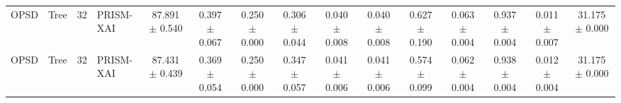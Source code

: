 \begin{table}[t]
\begin{tabular}{llllccccccccccc}
OPSD & Tree & 32 & PRISM-XAI & 87.891 $\pm$ 0.540 & 0.397 $\pm$ 0.067 & 0.250 $\pm$ 0.000 & 0.306 $\pm$ 0.044 & 0.040 $\pm$ 0.008 & 0.040 $\pm$ 0.008 & 0.627 $\pm$ 0.190 & 0.063 $\pm$ 0.004 & 0.937 $\pm$ 0.004 & 0.011 $\pm$ 0.007 & 31.175 $\pm$ 0.000 \\
OPSD & Tree & 32 & PRISM-XAI & 87.431 $\pm$ 0.439 & 0.369 $\pm$ 0.054 & 0.250 $\pm$ 0.000 & 0.347 $\pm$ 0.057 & 0.041 $\pm$ 0.006 & 0.041 $\pm$ 0.006 & 0.574 $\pm$ 0.099 & 0.062 $\pm$ 0.004 & 0.938 $\pm$ 0.004 & 0.012 $\pm$ 0.004 & 31.175 $\pm$ 0.000 \\
\bottomrule
\end{tabular}
\end{table}
